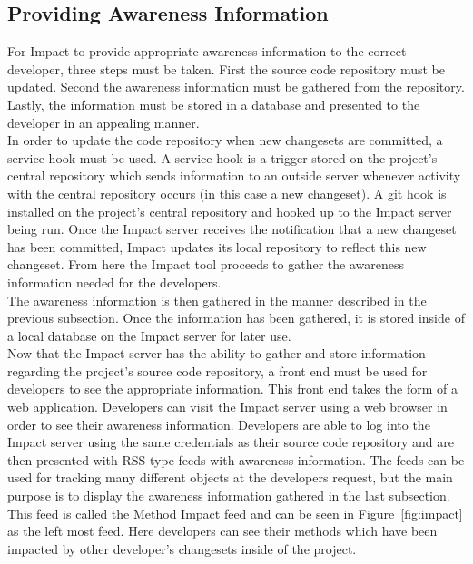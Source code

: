 \documentclass[conference]{IEEEtran}
\begin{document}
\subsection{Providing Awareness Information}
For Impact to provide appropriate awareness information to the correct developer, three steps must be taken.
First the source code repository must be updated. Second the awareness information must be gathered from 
the repository. Lastly, the information must be stored in a database and presented to the developer in an 
appealing manner. \\

In order to update the code repository when new changesets are committed, a service hook must be used.
A service hook is a trigger stored on the project's central repository which sends information to an outside
server whenever activity with the central repository occurs (in this case a new changeset). A git hook is installed
on the project's central repository and hooked up to the Impact server being run. Once the Impact server 
receives the notification that a new changeset has been committed, Impact updates its local repository to
reflect this new changeset. From here the Impact tool proceeds to gather the awareness information needed
for the developers. \\

The awareness information is then gathered in the manner described in the previous subsection. Once the 
information has been gathered, it is stored inside of a local database on the Impact server for later use.\\

Now that the Impact server has the ability to gather and store information regarding the project's source code
repository, a front end must be used for developers to see the appropriate information. This front end
takes the form of a web application. Developers can visit the Impact server using a web browser in order to
see their awareness information. Developers are able to log into the Impact server using the same credentials 
as their source code repository and are then presented with RSS type feeds with awareness information.
The feeds can be used for tracking many different objects at the developers request, but the main purpose
is to display the awareness information gathered in the last subsection. This feed is called the Method Impact
feed and can be seen in Figure~\ref{fig:impact} as the left most feed. Here developers can see their methods
which have been impacted by other developer's changesets inside of the project. \\
\end{document}
